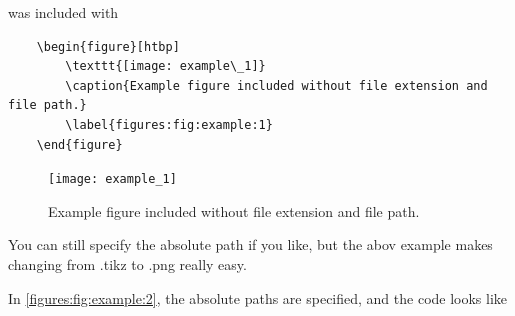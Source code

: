             

 was included with 


\begin{verbatim}
    \begin{figure}[htbp]
        \texttt{[image: example\_1]}
        \caption{Example figure included without file extension and file path.}
        \label{figures:fig:example:1}
    \end{figure}
\end{verbatim}


\begin{figure}[htbp]
    \texttt{[image: example\_1]}
    \caption{Example figure included without file extension and file path.}
    \label{figures:fig:example:1}
\end{figure}

    You can still specify the absolute path if you like, but the abov example makes changing from .tikz to .png really easy. 
    
    In \cref{figures:fig:example:2}, the absolute paths are specified, and the code looks like

